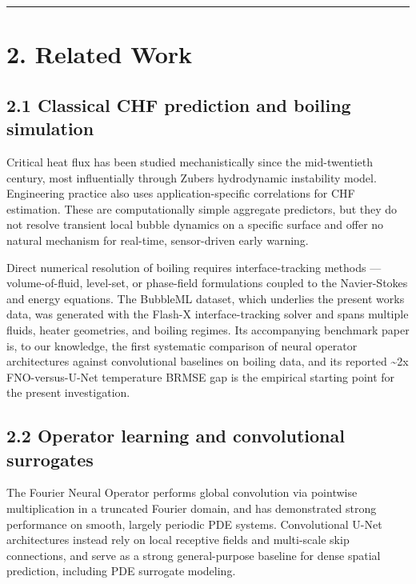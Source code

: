\documentclass[preprint,12pt]{elsarticle}
\begin{document}
\begin{center}\rule{0.5\linewidth}{0.5pt}\end{center}

\section*{2. Related Work}\label{2-related-work}

\subsection*{2.1 Classical CHF prediction and boiling
simulation}\label{21-classical-chf-prediction-and-boiling-simulation}

Critical heat flux has been studied mechanistically since the
mid-twentieth century, most influentially through
Zuber\textquotesingle s hydrodynamic instability model\cite{zuber1959hydrodynamic}. Engineering
practice also uses application-specific correlations for CHF estimation.
These are computationally simple aggregate predictors, but they do not
resolve transient local bubble dynamics on a specific surface and offer
no natural mechanism for real-time, sensor-driven early warning.

Direct numerical resolution of boiling requires interface-tracking
methods --- volume-of-fluid, level-set, or phase-field formulations
coupled to the Navier-Stokes and energy equations. The BubbleML dataset\cite{hassan2023bubbleml},
which underlies the present work\textquotesingle s data, was generated
with the Flash-X interface-tracking solver and spans multiple fluids,
heater geometries, and boiling regimes. Its accompanying benchmark paper
is, to our knowledge, the first systematic comparison of neural operator
architectures against convolutional baselines on boiling data, and its
reported \textasciitilde2x FNO-versus-U-Net temperature BRMSE gap is the
empirical starting point for the present investigation.

\subsection*{2.2 Operator learning and convolutional
surrogates}\label{22-operator-learning-and-convolutional-surrogates}

The Fourier Neural Operator\cite{li2021fno} performs global convolution via pointwise
multiplication in a truncated Fourier domain, and has demonstrated
strong performance on smooth, largely periodic PDE systems.
Convolutional U-Net architectures\cite{ronneberger2015unet} instead rely on local receptive fields
and multi-scale skip connections, and serve as a strong general-purpose
baseline for dense spatial prediction, including PDE surrogate modeling.
\end{document}
